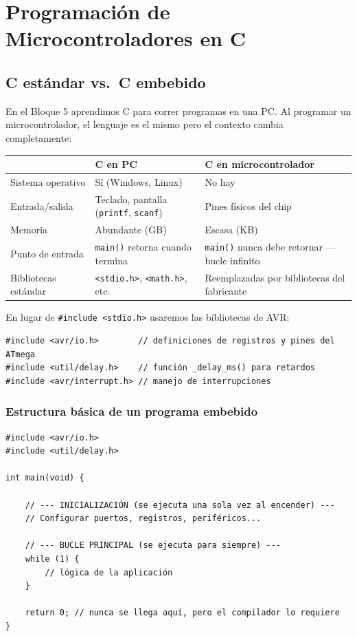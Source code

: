 \chapter{Programación de Microcontroladores en C}

\section{C estándar vs.\ C embebido}

En el Bloque 5 aprendimos C para correr programas en una PC. Al programar un
microcontrolador, el lenguaje es el mismo pero el contexto cambia completamente:

\begin{table}[H]
\centering
\begin{tabular}{lll}
\toprule
 & \textbf{C en PC} & \textbf{C en microcontrolador} \\
\midrule
Sistema operativo & Sí (Windows, Linux) & No hay \\
Entrada/salida & Teclado, pantalla (\texttt{printf}, \texttt{scanf}) & Pines físicos del chip \\
Memoria & Abundante (GB) & Escasa (KB) \\
Punto de entrada & \texttt{main()} retorna cuando termina & \texttt{main()} nunca debe retornar --- bucle infinito \\
Bibliotecas estándar & \texttt{<stdio.h>}, \texttt{<math.h>}, etc. & Reemplazadas por bibliotecas del fabricante \\
\bottomrule
\end{tabular}
\end{table}

En lugar de \texttt{\#include <stdio.h>} usaremos las bibliotecas de AVR:

\begin{lstlisting}[style=estilo-c]
#include <avr/io.h>        // definiciones de registros y pines del ATmega
#include <util/delay.h>    // función _delay_ms() para retardos
#include <avr/interrupt.h> // manejo de interrupciones
\end{lstlisting}

\subsection{Estructura básica de un programa embebido}

\begin{lstlisting}[style=estilo-c]
#include <avr/io.h>
#include <util/delay.h>

int main(void) {

    // --- INICIALIZACIÓN (se ejecuta una sola vez al encender) ---
    // Configurar puertos, registros, periféricos...

    // --- BUCLE PRINCIPAL (se ejecuta para siempre) ---
    while (1) {
        // lógica de la aplicación
    }

    return 0; // nunca se llega aquí, pero el compilador lo requiere
}
\end{lstlisting}

